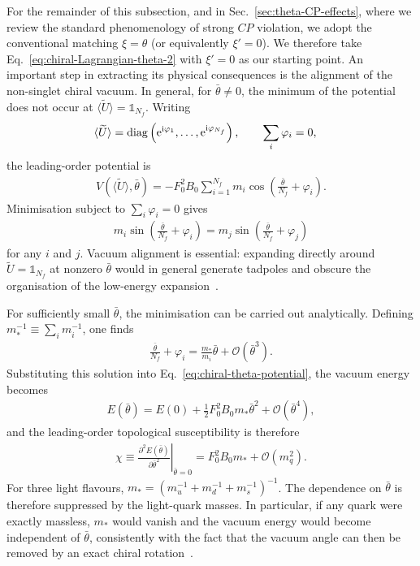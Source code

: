 \documentclass[review]{elsarticle}
\numberwithin{equation}{section}
\numberwithin{table}{section}
\numberwithin{figure}{section}
\def\i{\mathrm{i}}
\def\e{\mathrm{e}}
\begin{document}
For the remainder of this subsection, and in Sec.~\ref{sec:theta-CP-effects}, where we review the standard phenomenology of strong $CP$ violation, we adopt the conventional matching $\xi=\theta$ (or equivalently $\xi'=0$). We therefore take Eq.~\eqref{eq:chiral-Lagrangian-theta-2} with $\xi'=0$ as our starting point. An important step in extracting its physical consequences is the alignment of the non-singlet chiral vacuum. In general, for $\bar\theta\neq0$, the minimum of the potential does not occur at $\langle\widetilde U\rangle=\mathbb{1}_{N_f}$. Writing
\begin{align}
   \langle \widetilde{U}\rangle 
   &= 
   {\rm diag} 
   \left( \e^{\i\varphi_1}, \ldots, \e^{\i\varphi_{N_f}} \right), \qquad \sum_i\varphi_i=0,
\end{align}
the leading-order potential is
\begin{align}
    V(\langle \widetilde{U}\rangle,\bar\theta) = -F_0^2B_0 \sum_{i=1}^{N_f} m_i \cos\left( \frac{\bar\theta}{N_f}+\varphi_i \right). \label{eq:chiral-theta-potential}
\end{align}
Minimisation subject to $\sum_i\varphi_i=0$ gives
\begin{align}
    m_i\sin\left( \frac{\bar\theta}{N_f}+\varphi_i \right) = m_j\sin\left( \frac{\bar\theta}{N_f}+\varphi_j \right) \label{eq:chiral-vacuum-alignment}
\end{align}
for any $i$ and $j$. Vacuum alignment is essential: expanding directly around $\widetilde U=\mathbb{1}_{N_f}$ at nonzero $\bar\theta$ would in general generate tadpoles and obscure the organisation of the low-energy expansion~\cite{Crewther:1979pi,Leutwyler:1992yt}.

For sufficiently small $\bar\theta$, the minimisation can be carried out analytically. Defining $m_*^{-1}\equiv\sum_i m_i^{-1}$, one finds
\begin{align}
    \frac{\bar\theta}{N_f}+\varphi_i
    =
    \frac{m_*}{m_i}\bar\theta
    +
    \mathcal{O}(\bar\theta^3).
    \label{eq:vacuum-alignment-small-theta}
\end{align}
Substituting this solution into Eq.~\eqref{eq:chiral-theta-potential}, the vacuum energy becomes
\begin{align}
    E(\bar\theta) = E(0) + \frac{1}{2}F_0^2B_0m_*\bar\theta^2 + \mathcal{O}(\bar\theta^4), 
    \label{eq:chiral-vacuum-energy-small-theta}
\end{align}
and the leading-order topological susceptibility is therefore
\begin{align}
    \chi \equiv \left. \frac{\partial^2E(\bar\theta)} {\partial\bar\theta^2}\right|_{\bar\theta=0}
    =
    F_0^2B_0m_* + \mathcal{O}(m_q^2).
    \label{eq:chiral-topological-susceptibility}
\end{align}
For three light flavours, $m_*=(m_u^{-1}+m_d^{-1}+m_s^{-1})^{-1}$. The dependence on $\bar\theta$ is therefore suppressed by the light-quark masses. In particular, if any quark were exactly massless, $m_*$ would vanish and the vacuum energy would become independent of $\bar\theta$, consistently with the fact that the vacuum angle can then be removed by an exact chiral rotation~\cite{Crewther:1979pi,Leutwyler:1992yt}.
\end{document}
